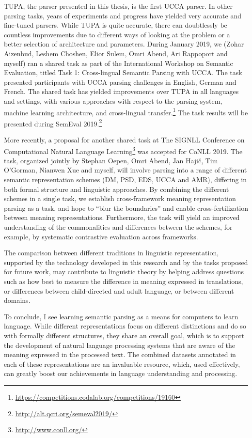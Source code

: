 \documentclass[12pt,a4paper]{report}
\begin{document}
TUPA, the parser presented in this thesis, is the first UCCA parser.
In other parsing tasks, years of experiments and progress have yielded very
accurate and fine-tuned parsers.
While TUPA is quite accurate, there can doubtlessly be countless improvements
due to different ways of looking at the problem or a better selection of architecture
and parameters.
During January 2019, we (Zohar Aizenbud, Leshem Choshen, Elior Sulem, Omri Abend,
Ari Rappoport and myself) ran a shared task as part of the
International Workshop on Semantic Evaluation, titled
Task 1: Cross-lingual Semantic Parsing with UCCA.
The task presented participants with UCCA parsing challenges
in English, German and French.
The shared task has yielded improvements over TUPA
in all languages and settings,
with various approaches with respect to the parsing system,
machine learning architecture, and cross-lingual
transfer.\footnote{\url{https://competitions.codalab.org/competitions/19160}}
The task results will be presented during SemEval
2019.\footnote{\url{http://alt.qcri.org/semeval2019/}}

More recently, a proposal for another shared task at
The SIGNLL Conference on Computational Natural Language
Learning\footnote{\url{http://www.conll.org/}} was accepted for CoNLL 2019.
The task, organized jointly by Stephan Oepen, Omri Abend, Jan Haji\v{c},
Tim O'Gorman, Nianwen Xue and myself,
will involve parsing into a range of different semantic representation schemes
(DM, PSD, EDS, UCCA and AMR), differing in both formal structure and linguistic
approaches.
By combining the different schemes in a single task, we
establish cross-framework meaning representation parsing as a task,
and hope to ``blur the boundaries'' and enable cross-fertilization between
meaning representations.
Furthermore, the task will yield an improved understanding of the commonalities
and differences between the schemes, for example, by systematic contrastive evaluation
across frameworks.

The comparison between different traditions in linguistic representation,
supported by the technology developed in this research
and by the tasks proposed for future work,
may contribute to linguistic theory by helping address questions such as
how best to measure the difference in meaning expressed in translations,
or differences between child-directed and adult language,
or between different domains.

To conclude, I see learning semantic parsing as a means for computers to learn language.
While different representations focus on different distinctions and do so
with formally different structures, they share an overall goal,
which is to support the development of natural language processing systems
that are aware of the meaning expressed in the processed text.
The combined datasets annotated in each of these representations are an invaluable
resource, which, used effectively, can greatly boost our achievements in
language understanding and processing.
\end{document}

